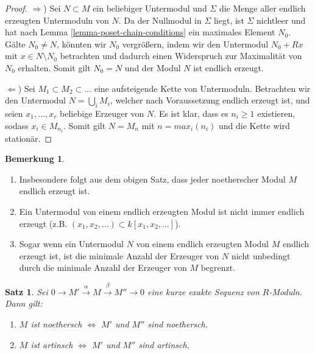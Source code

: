 \documentclass[reqno,12pt]{article}
\numberwithin{equation}{section}
\theoremstyle{plain}
\newtheorem{proposition}[thm]{Satz}
\theoremstyle{definition}
\newtheorem{remark}[thm]{Bemerkung}
\begin{document}
\begin{proof}
$\Rightarrow$) Sei $N \subset M$ ein beliebiger Untermodul und $\Sigma$ die Menge aller endlich erzeugten Untermoduln von $N$. Da der Nullmodul in $\Sigma$ liegt, ist $\Sigma$ nichtleer und hat nach Lemma \ref{lemma-poset-chain-conditions} ein maximales Element $N_0$. Gälte $N_0 \neq N$, könnten wir $N_0$ vergrößern, indem wir den Untermodul $N_0 + Rx$ mit $x \in N \setminus N_0$ betrachten und dadurch einen Widerspruch zur Maximalität von $N_0$ erhalten. Somit gilt $N_0=N$ und der Modul $N$ ist endlich erzeugt.


$\Leftarrow$) Sei $M_1 \subset M_2 \subset \dots$ eine aufsteigende Kette von Untermoduln. Betrachten wir den Untermodul $N=\bigcup_i M_i$, welcher nach Voraussetzung endlich erzeugt ist, und seien $x_1, \dots , x_r$ beliebige Erzeuger von $N$. Es ist klar, dass es $n_i \geq 1$ existieren, sodass $x_i \in M_{n_i}$. Somit gilt $N=M_n$ mit $n = max_i (n_i)$ und die Kette wird stationär.
\end{proof}

\begin{remark}
\
\begin{enumerate}
\item Insbesondere folgt aus dem obigen Satz, dass jeder noetherscher Modul $M$ endlich erzeugt ist.
\item Ein Untermodul von einem endlich erzeugten Modul ist nicht immer endlich erzeugt (z.B. $(x_1, x_2, \dots) \subset k[x_1, x_2, \dots ]$).
\item Sogar wenn ein Untermodul $N$ von einem endlich erzeugten Modul $M$ endlich erzeugt ist, ist die minimale Anzahl der Erzeuger von $N$ nicht unbedingt durch die minimale Anzahl der Erzeuger von $M$ begrenzt.
\end{enumerate}

\end{remark}


\begin{proposition}\label{proposition-noetherian-artinian-short-exact-sequence}
Sei $0 \to M' \overset{\alpha}{\to} M \overset{\beta}{\to} M'' \to 0$ eine kurze exakte Sequenz von $R$-Moduln. Dann gilt:
\begin{enumerate}
\item $M$ ist noethersch $\iff$ $M'$ und $M''$ sind noethersch.
\item $M$ ist artinsch $\iff$ $M'$ und $M''$ sind artinsch.
\end{enumerate}
\end{proposition}
\end{document}
